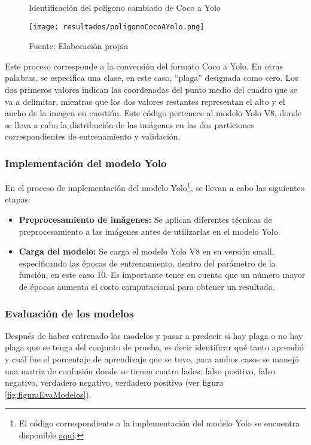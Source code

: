 \begin{figure}[h]
\centering
\caption{Identificación del polígono cambiado de Coco a Yolo}
\texttt{[image: resultados/poligonoCocoAYolo.png]}
\caption*{\footnotesize Fuente: Elaboración propia}
\label{fig:figuraPoligonoCocoAYolo}
\end{figure}


Este proceso corresponde a la conversión del formato Coco a Yolo. En otras palabras, se especifica una clase, en este caso, ``plaga'' designada como cero. Los dos primeros valores indican las coordenadas del punto medio del cuadro que se va a delimitar, mientras que los dos valores restantes representan el alto y el ancho de la imagen en cuestión. Este código pertenece al modelo Yolo V8, donde se lleva a cabo la distribución de las imágenes en las dos particiones correspondientes de entrenamiento y validación.


\subsubsection{Implementación del modelo Yolo}

En el proceso de implementación del modelo Yolo\footnote{El código correspondiente a la implementación del modelo Yolo se encuentra disponible \href{https://github.com/juferoto/mlops_project/blob/master/notebooks/modeloYolo.ipynb}{aquí}.}, se llevan a cabo las siguientes etapas:

\begin{itemize}
	\item \textbf{Preprocesamiento de imágenes:} Se aplican diferentes técnicas de preprocesamiento a las imágenes antes de utilizarlas en el modelo Yolo.

	\item \textbf{Carga del modelo:} Se carga el modelo Yolo V8 en su versión small, especificando las épocas de entrenamiento, dentro del parámetro de la función,  en  este  caso  10. Es importante tener en cuenta que un número mayor de épocas aumenta el costo computacional para obtener un resultado.
\end{itemize}

\newpage

\subsubsection{Evaluación de los modelos}

Después de haber entrenado los modelos y pasar a predecir si hay plaga o no hay plaga que se tenga del conjunto de prueba, es decir identificar qué tanto aprendió y cuál fue el porcentaje de aprendizaje que se tuvo, para ambos casos se manejó una matriz de confusión donde se tienen cuatro lados: falso positivo, falso negativo, verdadero negativo, verdadero positivo (ver figura \ref{fig:figuraEvaModelos}).

